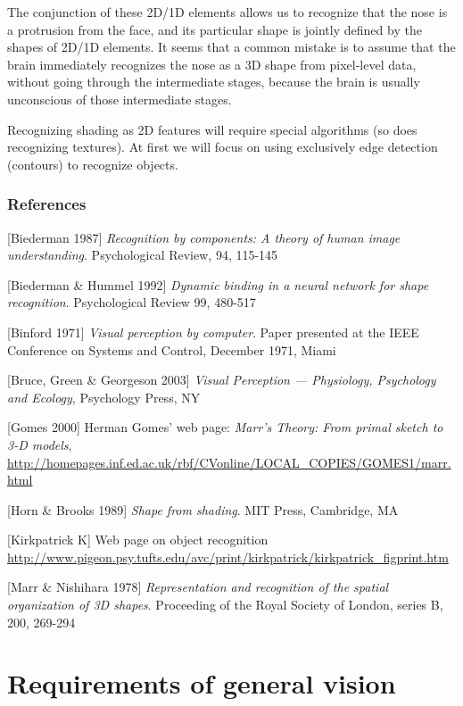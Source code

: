 The conjunction of these 2D/1D elements allows us to recognize that the nose is a protrusion from the face, and its particular shape is jointly defined by the shapes of  2D/1D elements. It seems that a common mistake is to assume that the brain immediately recognizes the nose as a 3D shape  from pixel-level data, without going through the intermediate stages, because the brain is usually unconscious of those intermediate stages.

Recognizing shading as 2D features will require special algorithms (so does recognizing textures). At first we will focus on using exclusively edge detection (contours) to recognize objects.

\subsubsection{References}

[Biederman 1987] \emph{Recognition by components: A theory of human image understanding}. Psychological Review, 94, 115-145

[Biederman \& Hummel 1992] \emph{Dynamic binding in a neural network for shape recognition}. Psychological Review 99, 480-517 

[Binford 1971] \emph{Visual perception by computer}. Paper presented at the IEEE Conference on Systems and Control, December 1971, Miami

[Bruce, Green \& Georgeson 2003] \emph{Visual Perception --- Physiology, Psychology and Ecology}, Psychology Press, NY

[Gomes 2000] Herman Gomes' web page: \emph{Marr's Theory: From primal sketch to 3-D models}, \href{http://homepages.inf.ed.ac.uk/rbf/CVonline/LOCAL_COPIES/GOMES1/marr.html}{http://homepages.inf.ed.ac.uk/rbf/CVonline/LOCAL\_COPIES/GOMES1/marr.html}

[Horn \& Brooks 1989] \emph{Shape from shading}. MIT Press, Cambridge, MA

[Kirkpatrick K] Web page on object recognition \href{http://www.pigeon.psy.tufts.edu/avc/print/kirkpatrick/kirkpatrick_figprint.htm}{http://www.pigeon.psy.tufts.edu/avc/print/kirkpatrick/kirkpatrick\_figprint.htm}

[Marr \& Nishihara 1978] \emph{Representation and recognition of the spatial organization of 3D shapes}. Proceeding of the Royal Society of London, series B, 200, 269-294 

\section{Requirements of general vision}

